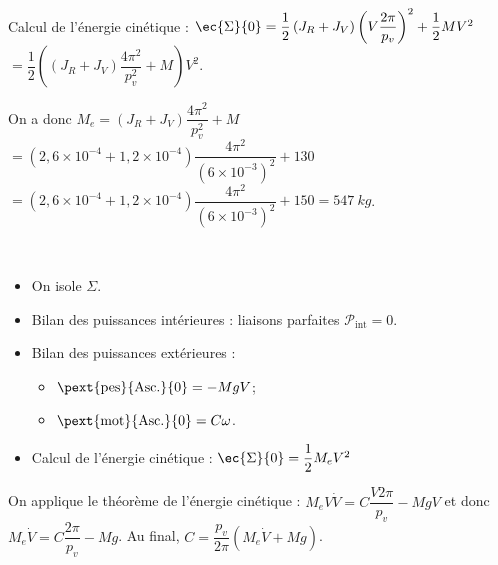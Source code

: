 \begin{multicols}{2}
\ifprof
\begin{corrige}~\\
Calcul de l'énergie cinétique : $\ec{\Sigma}{0} = \dfrac{1}{2}\left( J_R+J_V\right) \left(  V\dfrac{2\pi}{p_v}\right)^2+\dfrac{1}{2}MV^2$ $= \dfrac{1}{2}\left(\left( J_R+J_V\right) \dfrac{4\pi^2}{p_v^2} +M \right)V^2$.

On a donc $M_e = \left( J_R+J_V\right) \dfrac{4\pi^2}{p_v^2} +M$ $=\left( 2,6\times 10^{-4}+1,2\times 10^{-4}\right) \dfrac{4\pi^2}{\left( 6\times 10^{-3}\right)^2} +130$
$=\left( 2,6\times 10^{-4}+1,2\times 10^{-4}\right) \dfrac{4\pi^2}{\left( 6\times 10^{-3}\right)^2} +150 = \SI{547}{kg}$.
\end{corrige}
\else
\fi


\ifprof
\begin{corrige}~\\
\begin{itemize}
\item On isole $\Sigma$. 
\item Bilan des puissances intérieures : liaisons parfaites $\mathcal{P}_{\text{int}} = 0$.
\item Bilan des puissances extérieures : 
\begin{itemize}
\item $\pext{\text{pes}}{\text{Asc.}}{0}=-MgV$;
\item $\pext{\text{mot}}{\text{Asc.}}{0}=C\omega$.
\end{itemize}
\item Calcul de l'énergie cinétique : $\ec{\Sigma}{0} = \dfrac{1}{2}M_eV^2$
\end{itemize}
On applique le théorème de l'énergie cinétique : $M_e V \dot{V} =C\dfrac{V2\pi}{p_v} - MgV$ et donc 
$M_e \dot{V} =C\dfrac{2\pi}{p_v} - Mg$. Au final, $C = \dfrac{p_v}{2\pi}\left(M_e \dot{V} +Mg\right) $.
\end{corrige}
\else
\fi



\end{multicols}
